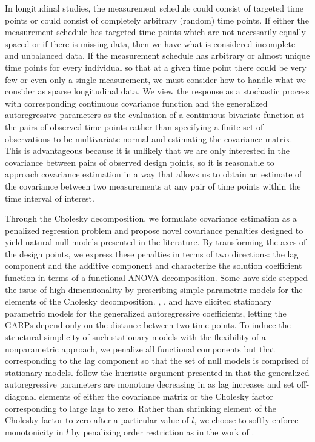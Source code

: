 \documentclass[12pt]{article}
\begin{document}
In longitudinal studies, the measurement schedule could consist of targeted time points or could consist of completely arbitrary (random) time points. If either the measurement schedule has targeted time points which are not necessarily equally spaced or if there is missing data, then we have what is considered incomplete and unbalanced data. If the measurement schedule has arbitrary or almost unique time points for every individual so that at a given time point there could be very few or even only a single measurement, we must consider how to handle what we consider as sparse longitudinal data. We view the response as a stochastic process with corresponding continuous covariance function and the generalized autoregressive parameters as the evaluation of a continuous bivariate function at the pairs of observed time points rather than specifying a finite set of observations to be multivariate normal and estimating the covariance matrix. This is advantageous because it is unlikely that we are only interested in the covariance between pairs of observed design points, so it is reasonable to approach covariance estimation in a way that allows us to obtain an estimate of the covariance between two measurements at any pair of time points within the time interval of interest. 


Through the Cholesky decomposition, we formulate covariance estimation as a penalized regression problem and propose novel covariance penalties designed to yield natural null models presented in the literature. By transforming the axes of the design points, we express these penalties in terms of two directions: the lag component and the additive component and characterize the solution coefficient function in terms of a functional ANOVA decomposition. Some have side-stepped the issue of high dimensionality by prescribing simple parametric models for the elements of the Cholesky decomposition. \citet{chen2011efficient}, \citet{pourahmadi1999joint}, and \citet{pourahmadi2002dynamic} have elicited stationary parametric models for the generalized autoregressive coefficients, letting the GARPs depend only on the distance between two time points. To induce the structural simplicity of such stationary models with the flexibility of a nonparametric approach, we penalize all functional components but that corresponding to the lag component so that the set of null models is comprised of stationary models. \cite{huang2007estimation} follow the hueristic argument presented in \cite{pourahmadi1999joint} that the generalized autoregressive parameters are monotone decreasing in as lag increases and set off-diagonal elements of either the covariance matrix or the Cholesky factor corresponding to large lags to zero. Rather than shrinking element of the Cholesky factor to zero after a particular value of $l$, we choose to softly enforce monotonicity in $l$ by penalizing order restriction as in the work of \citet{tibshirani2011nearly}. 
	
\end{document}
